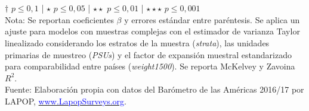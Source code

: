 \documentclass[a4paper]{tufte-handout}
\begin{document}
\begin{table}[h]
  \\~\\ \smallskip\noindent\scriptsize $\dagger$ $p \leq 0,1$ | $\star$ $p \leq 0,05$ | $\star\star$ $p \leq 0,01$ | $\star\star\star$ $p \leq 0,001$  \\ Nota: Se reportan coeficientes $\beta$ y errores estándar entre paréntesis. Se aplica un ajuste para modelos con muestras complejas con el estimador de varianza Taylor linealizado considerando los estratos de la muestra ({\itshape strata}), las unidades primarias de muestreo ({\itshape PSUs}) y el factor de expansión muestral estandarizado para comparabilidad entre países ({\itshape weight1500}). Se reporta McKelvey y Zavoina $R^2$. \\ Fuente: Elaboración propia con datos del Barómetro de las Américas 2016/17 por LAPOP, \href{https://www.vanderbilt.edu/lapop/}{\textcolor{blue}{www.LapopSurveys.org}}.
\end{table}
\end{document}
